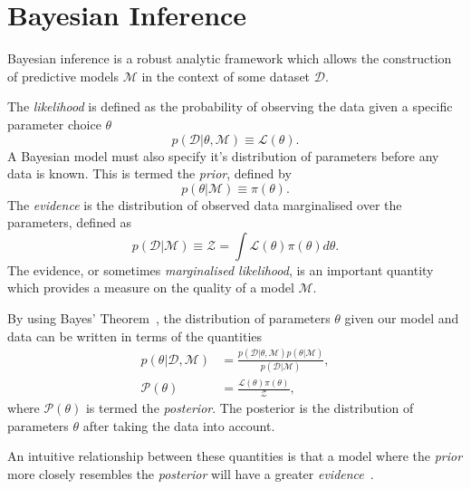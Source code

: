 \documentclass[11pt]{article}
\begin{document}
    \section{Bayesian Inference}\label{sec:bayesian_inference}
    Bayesian inference is a robust analytic framework which allows the construction of predictive models $\mathcal{M}$
    in the context of some dataset $\mathcal{D}$.

    The \emph{likelihood} is defined as the probability of observing the data given a specific parameter choice $\theta$
    \begin{equation}\label{eq:likelihood}
        p(\mathcal{D} | \theta, \mathcal{M}) \equiv \mathcal{L}(\theta).
    \end{equation}
    A Bayesian model must also specify it's distribution of parameters before any data is known.
    This is termed the \emph{prior}, defined by
    \begin{equation}\label{eq:prior}
        p(\theta|\mathcal{M}) \equiv \pi(\theta).
    \end{equation}
    The \emph{evidence} is the distribution of observed data marginalised over the parameters, defined as
    \begin{equation}\label{eq:evidence}
        p(\mathcal{D} | \mathcal{M}) \equiv \mathcal{Z} = \int{\mathcal{L}(\theta) \pi(\theta) d\theta}.
    \end{equation}
    The evidence, or sometimes \emph{marginalised likelihood}, is an important quantity which provides a measure
    on the quality of a model $\mathcal{M}$.

    By using Bayes' Theorem~\cite{bishop2006}, the distribution of parameters $\theta$ given our model and data
    can be written in terms of the quantities
    \begin{equation}\label{eq:bayes_theorem}
    \begin{aligned}
        p(\theta | \mathcal{D}, \mathcal{M}) &=
            \frac{p(\mathcal{D} | \theta, \mathcal{M}) p(\theta|\mathcal{M})}{p(\mathcal{D} | \mathcal{M})}, \\
        \mathcal{P}(\theta) &= \frac{\mathcal{L}(\theta) \pi(\theta)}{\mathcal{Z}},
    \end{aligned}
    \end{equation}
    where $\mathcal{P}(\theta)$ is termed the \emph{posterior}.
    The posterior is the distribution of parameters $\theta$ after taking the data into account.

    An intuitive relationship between these quantities is that a model where the \emph{prior} more closely
    resembles the \emph{posterior} will have a greater \emph{evidence}~\cite{mackay2003}.
\end{document}
